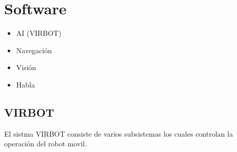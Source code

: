 \documentclass[a4paper]{book}
\begin{document}
\chapter{Software}

\begin{itemize}
	\item{AI (VIRBOT)}

	\item{Navegación}
	
	\item{Visión}
	
	\item{Habla}
\end{itemize}

\section{VIRBOT}

El sistma VIRBOT consiste de varios subsistemas los cuales controlan la operación del robot movil.
\end{document}
